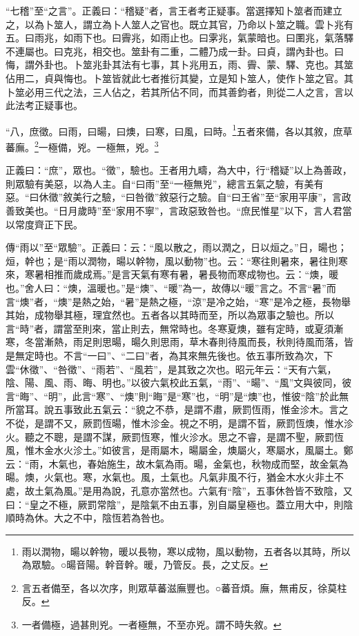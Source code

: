 {\noindent\shu{}\fzkt “七稽”至“之言”。正義曰：“稽疑”者，言王者考正疑事。當選擇知卜筮者而建立之，以為卜筮人，謂立為卜人筮人之官也。既立其官，乃命以卜筮之職。雲卜兆有五。曰雨兆，如雨下也。曰霽兆，如雨止也。曰雺兆，氣蒙暗也。曰圛兆，氣落驛不連屬也。曰克兆，相交也。筮卦有二重，二體乃成一卦。曰貞，謂內卦也。曰悔，謂外卦也。卜筮兆卦其法有七事，其卜兆用五，雨、霽、蒙、驛、克也。其筮佔用二，貞與悔也。卜筮皆就此七者推衍其變，立是知卜筮人，使作卜筮之官。其卜筮必用三代之法，三人佔之，若其所佔不同，而其善鈞者，則從二人之言，言以此法考正疑事也。 \par}

“八，庶徵。曰雨，曰暘，曰燠，曰寒，曰風，曰時。\footnote{雨以潤物，暘以幹物，暖以長物，寒以成物，風以動物，五者各以其時，所以為眾驗。○暘音陽。幹音幹。暖，乃管反。長，之丈反。}五者來備，各以其敘，庶草蕃廡。\footnote{言五者備至，各以次序，則眾草蕃滋廡豐也。○蕃音煩。廡，無甫反，徐莫柱反。}一極備，兇。一極無，兇。\footnote{一者備極，過甚則兇。一者極無，不至亦兇。謂不時失敘。}

{\noindent\shu{}\fzkt 正義曰：“庶”，眾也。“徵”，驗也。王者用九疇，為大中，行“稽疑”以上為善政，則眾驗有美惡，以為人主。自“曰雨”至“一極無兇”，總言五氣之驗，有美有惡。“曰休徵”敘美行之驗，“曰咎徵”敘惡行之驗。自“曰王省”至“家用平康”，言政善致美也。“日月歲時”至“家用不寧”，言政惡致咎也。“庶民惟星”以下，言人君當以常度齊正下民。 \par}

{\noindent\zhuan{}\fzbyks 傳“雨以”至“眾驗”。正義曰：云：“風以散之，雨以潤之，日以烜之。”日，暘也；烜，幹也；是“雨以潤物，暘以幹物，風以動物”也。云：“寒往則暑來，暑往則寒來，寒暑相推而歲成焉。”是言天氣有寒有暑，暑長物而寒成物也。云：“燠，暖也。”舍人曰：“燠，溫暖也。”是“燠”、“暖”為一，故傳以“暖”言之。不言“暑”而言“燠”者，“燠”是熱之始，“暑”是熱之極，“涼”是冷之始，“寒”是冷之極，長物舉其始，成物舉其極，理宜然也。五者各以其時而至，所以為眾事之驗也。所以言“時”者，謂當至則來，當止則去，無常時也。冬寒夏燠，雖有定時，或夏須漸寒，冬當漸熱，雨足則思暘，暘久則思雨，草木春則待風而長，秋則待風而落，皆是無定時也。不言“一曰”、“二曰”者，為其來無先後也。依五事所致為次，下雲“休徵”、“咎徵”、“雨若”、“風若”，是其致之次也。昭元年云：“天有六氣，陰、陽、風、雨、晦、明也。”以彼六氣校此五氣，“雨”、“暘”、“風”文與彼同，彼言“晦”、“明”，此言“寒”、“燠”則“晦”是“寒”也，“明”是“燠”也，惟彼“陰”於此無所當耳。說五事致此五氣云：“貌之不恭，是謂不肅，厥罰恆雨，惟金沴木。言之不從，是謂不又，厥罰恆暘，惟木沴金。視之不明，是謂不晢，厥罰恆燠，惟水沴火。聽之不聰，是謂不謀，厥罰恆寒，惟火沴水。思之不睿，是謂不聖，厥罰恆風，惟木金水火沴土。”如彼言，是雨屬木，暘屬金，燠屬火，寒屬水，風屬土。鄭云：“雨，木氣也，春始施生，故木氣為雨。暘，金氣也，秋物成而堅，故金氣為暘。燠，火氣也。寒，水氣也。風，土氣也。凡氣非風不行，猶金木水火非土不處，故土氣為風。”是用為說，孔意亦當然也。六氣有“陰”，五事休咎皆不致陰，又曰：“皇之不極，厥罰常陰”，是陰氣不由五事，別自屬皇極也。蓋立用大中，則陰順時為休。大之不中，陰恆若為咎也。 \par}

